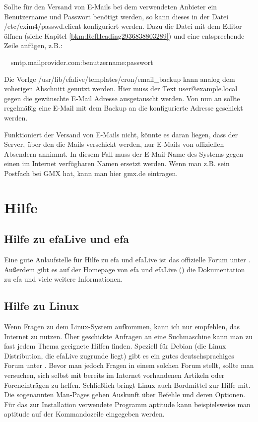 \documentclass[a4paper,12pt,twoside]{article}
\begin{document}
\bigskip

Sollte für den Versand von E-Mails bei dem verwendeten Anbieter ein
Benutzername und Passwort benötigt werden, so kann dieses in der Datei
/etc/exim4/passwd.client konfiguriert werden. Dazu die Datei mit dem
Editor öffnen (siehe Kapitel \ref{bkm:RefHeading2936838803289}) und
eine entsprechende Zeile anfügen, z.B.:


\bigskip

\ \ smtp.mailprovider.com:benutzername:passwort


\bigskip

Die Vorlge /usr/lib/efalive/templates/cron/email\_backup kann analog dem
voherigen Abschnitt genutzt werden. Hier muss der Text
user@example.local gegen die gewünschte E-Mail Adresse ausgetauscht
werden. Von nun an sollte regelmäßig eine E-Mail mit dem Backup an die
konfigurierte Adresse geschickt werden.


\bigskip

Funktioniert der Versand von E-Mails nicht, könnte es daran liegen, dass
der Server, über den die Mails verschickt werden, nur E-Mails von
offiziellen Absendern annimmt. In diesem Fall muss der
{\textquotedbl}E-Mail-Name des Systems{\textquotedbl} gegen einen im
Internet verfügbaren Namen ersetzt werden. Wenn man z.B. sein Postfach
bei GMX hat, kann man hier {\textquotedbl}gmx.de{\textquotedbl}
eintragen.


\bigskip

\section{Hilfe}
\subsection{Hilfe zu efaLive und efa}
Eine gute Anlaufstelle für Hilfe zu efa und efaLive ist das offizielle
Forum unter \cite{EFA3}. Außerdem gibt es auf der Homepage von efa und
efaLive (\cite{EFA1}\cite{EFA4}\cite{EFA5}) die Dokumentation zu efa
und viele weitere Informationen.


\bigskip

\subsection{Hilfe zu Linux}
Wenn Fragen zu dem Linux-System aufkommen, kann ich nur empfehlen, das
Internet zu nutzen. Über geschickte Anfragen an eine Suchmaschine kann
man zu fast jedem Thema geeignete Hilfen finden. Speziell für Debian
(die Linux Distribution, die efaLive zugrunde liegt) gibt es ein gutes
deutschsprachiges Forum unter \cite{HLP1}. Bevor man jedoch Fragen in
einem solchen Forum stellt, sollte man versuchen, sich selbst mit
bereits im Internet vorhandenen Artikeln oder Foreneinträgen zu helfen.
Schließlich bringt Linux auch Bordmittel zur Hilfe mit. Die sogenannten
Man-Pages geben Auskunft über Befehle und deren Optionen. Für das zur
Installation verwendete Programm {\textquotedbl}aptitude{\textquotedbl}
kann beispielsweise {\textquotedbl}man aptitude{\textquotedbl} auf der
Kommandozeile eingegeben werden.
\end{document}
